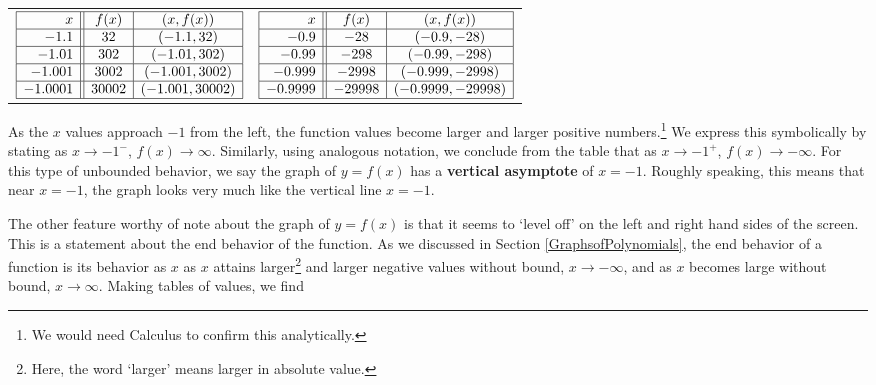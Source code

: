 \begin{center}
\begin{tabular}{cc}

$\begin{array}{|r||c|c|}  \hline

  x & f(x) & (x,f(x)) \\ \hline
 -1.1 & 32 & (-1.1, 32) \\  \hline
 -1.01 & 302 & (-1.01, 302) \\  \hline 
 -1.001 & 3002 & ( -1.001, 3002) \\  \hline 
  -1.0001 & 30002 & ( -1.001, 30002) \\  \hline 
  \end{array} $ \hspace{.75in} & 

$\begin{array}{|r||c|c|}  \hline 
  x & f(x) & (x,f(x)) \\ \hline
  -0.9 & -28 & ( -0.9 , -28) \\  \hline
  -0.99 & -298 & ( -0.99, -298) \\  \hline
  -0.999 & -2998& (-0.999,-2998) \\  \hline
   -0.9999 & -29998& (-0.9999,-29998) \\  \hline 

\end{array}$

\end{tabular}

\end{center}

As the $x$ values approach $-1$ from the left, the function values become larger and larger positive numbers.\footnote{We would need Calculus to confirm this analytically.}  We express this symbolically by stating as $x \rightarrow -1^{-}$, $f(x) \rightarrow \infty$.   Similarly, using analogous notation, we conclude from the table that as $x \rightarrow -1^{+}$, $f(x) \rightarrow -\infty$.  For this type of unbounded behavior, we say the graph of $y=f(x)$ has a \textbf{vertical asymptote} of $x = -1$.  Roughly speaking, this means that near $x=-1$, the graph looks very much like the vertical line $x=-1$. 

\smallskip

The other feature worthy of note about the graph of $y=f(x)$ is that it seems to `level off' on the left and right hand sides of the screen.  This is a statement about the end behavior of the function.  As we discussed in Section \ref{GraphsofPolynomials}, the end behavior of a function is its behavior as $x$ as $x$ attains larger\footnote{Here, the word `larger' means larger in absolute value.} and larger negative values without bound, $x \rightarrow -\infty$, and as $x$ becomes large without bound, $x \rightarrow \infty$.  Making tables of values, we find

